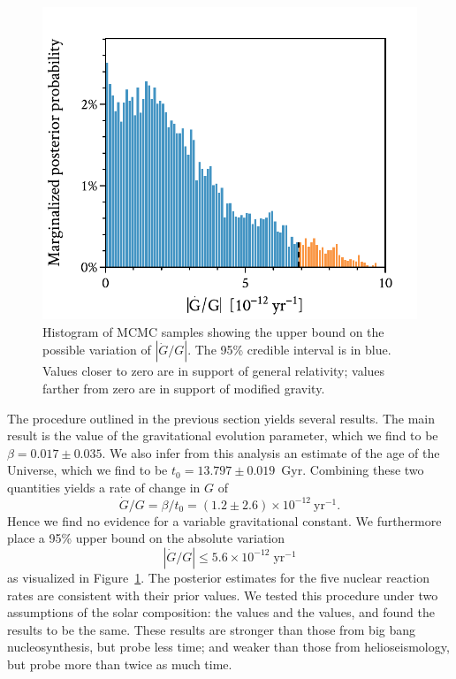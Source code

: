 \documentclass[twocolumn]{aastex63}
\newif\ifref
\newcommand{\mb}[1]{\ifref\textcolor{darkred}{#1}\else #1\fi}
\newif\ifrefff
\newcommand{\mbbb}[1]{\ifrefff\textcolor{darkred}{#1}\else #1\fi}
\begin{document}
\begin{figure}
    \centering
    \includegraphics[width=\linewidth, trim={0 0 0 0.5cm}, clip]{beta_posterior.pdf}
    \caption{\mb{Histogram of MCMC samples showing} the upper bound on the possible variation of $|\dot G/G|$. The 95\% credible interval is in blue. Values closer to zero are in support of general relativity; values farther from zero are in support of modified gravity. 
    \label{fig:upper-bound}} 
\end{figure}

The procedure outlined in the previous section yields several results. 
The main result is the value of the gravitational evolution parameter, which we find to be ${\beta = \mbbb{0.017 \pm 0.035}}$. 
We also infer from this analysis an estimate of the age of the Universe, which we find to be ${t_0 = \mbbb{13.797 \pm 0.019}}$~Gyr. 
Combining these two quantities yields a rate of change in $G$ of 
\begin{equation}
    \dot{G}/G = \beta/t_0 = \mbbb{(1.2 \pm 2.6)} \times 10^{-12}~\text{yr}^{-1}.
\end{equation}
Hence we find no evidence for a variable gravitational constant. 
We furthermore place a 95\% upper bound on the absolute variation 
\begin{equation}
    |\dot{G}/G| \leq \mbbb{5.6} \times 10^{-12}\;\text{yr}^{-1}
\end{equation}
as visualized in Figure~\ref{fig:upper-bound}. 
The posterior estimates for the five nuclear reaction rates are consistent with their prior values. 
We tested this procedure under two assumptions of the solar composition: the \citet[][``GS98'']{1998SSRv...85..161G} values and the \citet[][``AGSS09'']{2009ARA&A..47..481A} values, and found the results to be the same. 
\mb{These results are stronger than those from big bang nucleosynthesis, but probe less time; and weaker than those from helioseismology, but probe more than twice as much time.} 
\end{document}
